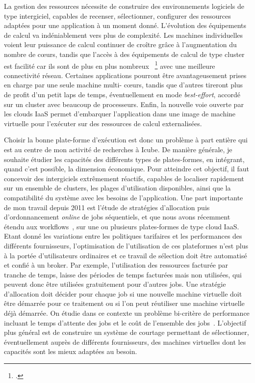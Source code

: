 \documentclass[11pt]{article}
\begin{document}
La gestion des  ressources nécessite de construire  des environnements logiciels
de  type  intergiciel,  capables   de  recenser,  sélectionner,  configurer  des
ressources  adaptées pour  une application  à un  moment donné.  L'évolution des
équipements de calcul  va indéniablement vers plus de  complexité.  Les machines
individuelles  voient leur  puissance de  calcul  continuer de  croître grâce  à
l'augmentation du nombre  de c{\oe}urs, tandis que l'accès à  des équipements de
calcul de  type cluster  est facilité car  ils sont de  plus en  plus nombreux~%
\footcite{Wu09} avec une meilleure  connectivité réseau.  Certaines applications
pourront être  avantageusement prises  en charge par  une seule  machine multi-%
c{\oe}urs, tandis que d'autres tireront plus de profit d'un petit laps de temps,
éventuellement  en  mode  \textit{best-effort},  accordé  sur  un  cluster  avec
beaucoup de  processeurs. Enfin, la  nouvelle voie  ouverte par les  clouds IaaS
permet  d'embarquer  l'application dans  une  image  de machine  virtuelle  pour
l'exécuter sur des ressources de calcul externalisées. 

Choisir la bonne plate-forme d'exécution est donc un problème à part entière qui
est au  centre de mon  activité de recherches à  Icube. De manière  générale, je
souhaite  étudier  les  capacités  des différents  types  de  plates-formes,  en
intégrant, quand  c'est possible,  la dimension  économique. Pour  atteindre cet
objectif, il faut  concevoir des intergiciels extrêmement  réactifs, capables de
localiser  rapidement sur  un  ensemble de  clusters,  les plages  d'utilisation
disponibles,  ainsi  que  la  compatibilité  du  système  avec  les  besoins  de
l'application.  Une  part importante de mon  travail depuis 2011 est  l'étude de
stratégies   d'allocation   puis   d'ordonnancement  \textit{online}   de   jobs
séquentiels, et que nous avons récemment étendu aux workflows~\cite{FrincuGG13},
sur  une  ou  plusieurs  plates-formes  de type  cloud  IaaS.  Etant  donné  les
variations entre  les politiques tarifaires  et les performances  des différents
fournisseurs, l'optimisation de l'utilisation de ces plateformes n'est plus à la
portée d'utilisateurs ordinaires et ce travail de sélection doit être automatisé
et confié  à un broker. Par  exemple, l'utilisation des ressources  facturée par
tranche de temps, laisse des périodes de temps facturées mais non utilisées, qui
peuvent  donc être  utilisées  gratuitement pour  d'autres  jobs. Une  stratégie
d'allocation doit décider pour chaque job si une nouvelle machine virtuelle doit
être  démarrée  pour ce  traitement  ou  si  l'on  peut réutiliser  une  machine
virtuelle déjà  démarrée. On étudie dans  ce contexte un problème  bi-critère de
performance incluant  le temps d'attente des  jobs et le coût  de l'ensemble des
jobs~\cite{icps-2011-225}.  L'objectif plus général est de construire un système
de  courtage permettant  de  sélectionner, éventuellement  auprès de  différents
fournisseurs, des machines virtuelles dont les capacités sont les mieux adaptées
au besoin.
\end{document}
